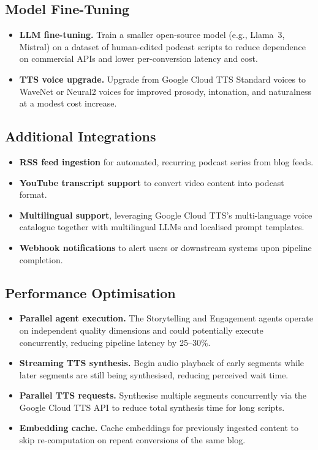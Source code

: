 \documentclass[sigconf,natbib=false]{acmart}   %
\begin{document}
\subsection{Model Fine-Tuning}
\begin{itemize}[nosep]
  \item \textbf{LLM fine-tuning.}  Train a smaller open-source model (e.g., Llama~3, Mistral) on a dataset of human-edited podcast scripts to reduce dependence on commercial APIs and lower per-conversion latency and cost.
  \item \textbf{TTS voice upgrade.}  Upgrade from Google Cloud TTS Standard voices to WaveNet or Neural2 voices for improved prosody, intonation, and naturalness at a modest cost increase.
\end{itemize}

\subsection{Additional Integrations}
\begin{itemize}[nosep]
  \item \textbf{RSS feed ingestion} for automated, recurring podcast series from blog feeds.
  \item \textbf{YouTube transcript support} to convert video content into podcast format.
  \item \textbf{Multilingual support}, leveraging Google Cloud TTS's multi-language voice catalogue together with multilingual LLMs and localised prompt templates.
  \item \textbf{Webhook notifications} to alert users or downstream systems upon pipeline completion.
\end{itemize}

\subsection{Performance Optimisation}
\begin{itemize}[nosep]
  \item \textbf{Parallel agent execution.}  The Storytelling and Engagement agents operate on independent quality dimensions and could potentially execute concurrently, reducing pipeline latency by 25--30\%.
  \item \textbf{Streaming TTS synthesis.}  Begin audio playback of early segments while later segments are still being synthesised, reducing perceived wait time.
  \item \textbf{Parallel TTS requests.}  Synthesise multiple segments concurrently via the Google Cloud TTS API to reduce total synthesis time for long scripts.
  \item \textbf{Embedding cache.}  Cache embeddings for previously ingested content to skip re-computation on repeat conversions of the same blog.
\end{itemize}
\end{document}
